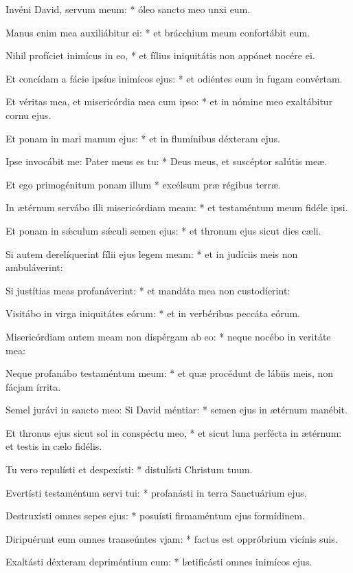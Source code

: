 \begin{psalmus}
    Invéni David, servum meum: * óleo sancto meo unxi eum.

    Manus enim mea auxiliábitur ei: * et brácchium meum confortábit eum.

    Nihil profíciet inimícus in eo, * et fílius iniquitátis non appónet nocére ei.

    Et concídam a fácie ipsíus inimícos ejus: * et odiéntes eum in fugam convértam.

    Et véritas mea, et misericórdia mea cum ipso: * et in nómine meo exaltábitur cornu ejus.

    Et ponam in mari manum ejus: * et in flumínibus déxteram ejus.

    Ipse invocábit me: Pater meus es tu: * Deus meus, et suscéptor salútis meæ.

    Et ego primogénitum ponam illum * excélsum præ régibus terræ.

    In ætérnum servábo illi misericórdiam meam: * et testaméntum meum fidéle ipsi.

    Et ponam in sǽculum sǽculi semen ejus: * et thronum ejus sicut dies cæli.

    Si autem derelíquerint fílii ejus legem meam: * et in judíciis meis non ambuláverint:

    Si justítias meas profanáverint: * et mandáta mea non custodíerint:

    Visitábo in virga iniquitátes eórum: * et in verbéribus peccáta eórum.

    Misericórdiam autem meam non dispérgam ab eo: * neque nocébo in veritáte mea:

    Neque profanábo testaméntum meum: * et quæ procédunt de lábiis meis, non fácjam írrita.

    Semel jurávi in sancto meo: Si David méntiar: * semen ejus in ætérnum manébit.

    Et thronus ejus sicut sol in conspéctu meo, * et sicut luna perfécta in ætérnum: et testis in cælo fidélis.

    Tu vero repulísti et despexísti: * distulísti Christum tuum.

    Evertísti testaméntum servi tui: * profanásti in terra Sanctuárium ejus.

    Destruxísti omnes sepes ejus: * posuísti firmaméntum ejus formídinem.

    Diripuérunt eum omnes transeúntes vjam: * factus est oppróbrium vicínis suis.

    Exaltásti déxteram depriméntium eum: * lætificásti omnes inimícos ejus.


\end{psalmus}
